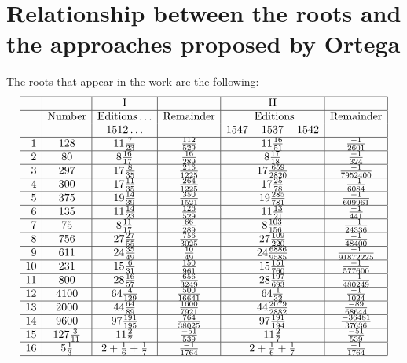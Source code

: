 \documentclass{amsart}
\begin{document}
\section {Relationship between the roots and the approaches proposed by Ortega}
The roots that appear in the work are the following:
$$\begin{array}{r|c|c|c|c|c|}
\hline
& & \text{I}& &\text{II}& \\
\hline
 & \text{Number}& \text{Editions}\ldots&\text{Remainder}&\text{ Editions}&\text{Remainder}\\
 && 1512 \ldots&&1547-1537-1542&\\
 \hline
 1&128&11\frac{7}{23}&\frac{112}{529}&11\frac{16}{51}&\frac{-1}{2601}\\
 \hline
 2&80&8\frac{16}{17}&\frac{16}{289}&8\frac{17}{18}& \frac{-1}{324}\\
 \hline
 3&297&17\frac{8}{35}&\frac{216}{1225}&17\frac{659}{2820}&\frac{-1}{7952400}\\
 \hline
 4&300&17\frac{11}{35}&\frac{264}{1225}&17\frac{25}{78}&\frac{-1}{6084}\\
 \hline
 5&375&19\frac{14}{39}&\frac{350}{1521}&19\frac{285}{781}&\frac{-1}{609961}\\
 \hline
 6&135&11\frac{14}{23}&\frac{126}{529}&11\frac{13}{21}&\frac{-1}{441}
\\
 \hline
 7&75&8\frac{11}{17}&\frac{66}{289
}&8\frac{103}{156}&\frac{-1}{24336}\\
 \hline
 8&756&27\frac{27}{55}&\frac{ 756}{3025
}&27\frac{109}{220}&\frac{-1}{48400}\\
 \hline
 9&611&24\frac{35}{49}&\frac{10}{49}&24\frac{6886}{9585}&\frac{-1}{91872225}\\
 \hline
 10&231&15\frac{6}{31}&\frac{150}{961
}&15\frac{151}{760}&\frac{-1}{577600}\\
 \hline
 11&800&28\frac{16}{57}&\frac{656}{3249}&28\frac{197}{693}&\frac{-1}{480249}\\
 \hline
 12&4100&64\frac{4}{129}&\frac{ 500}{16641}&64\frac{1}{32}&\frac{ -1}{1024
}\\
 \hline
 13&2000&44\frac{64}{89}&\frac{1600}{7921}&44\frac{2079}{2882}&\frac{-89}{68644
}\\
 \hline
 14&9600&97\frac{191}{195}&\frac{764}{38025}&97\frac{191}{194}&\frac{-36481}{37636}\\
 \hline
 15&127\frac{3}{11}&11\frac{2}{7}&\frac{-51}{539}&11\frac{2}{7}&\frac{-51}{539}\\
 \hline
 16&5\frac{1}{3}&2+\frac{1}{6}+\frac{1}{7}&\frac{-1}{1764}&2+\frac{1}{6}+\frac{1}{7}&\frac{-1}{1764}\\
 \hline
 \end{array}
$$
\end{document}
